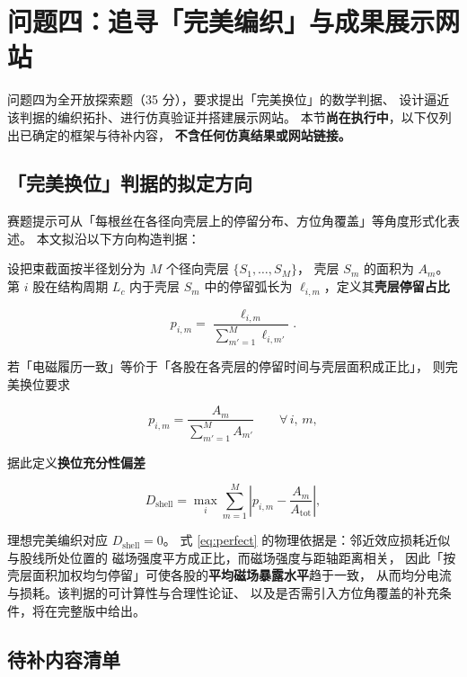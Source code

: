 \documentclass[12pt, a4paper]{ctexart}
\begin{document}
\section{问题四：追寻「完美编织」与成果展示网站}
\label{sec:q4}

\begin{todobox}[本节状态说明]
问题四为全开放探索题（35 分），要求提出「完美换位」的数学判据、
设计逼近该判据的编织拓扑、进行仿真验证并搭建展示网站。
本节\textbf{尚在执行中}，以下仅列出已确定的框架与待补内容，
\textbf{不含任何仿真结果或网站链接。}
\end{todobox}

\subsection{「完美换位」判据的拟定方向}

赛题提示可从「每根丝在各径向壳层上的停留分布、方位角覆盖」等角度形式化表述。
本文拟沿以下方向构造判据：

设把束截面按半径划分为 $M$ 个径向壳层 $\{S_1,\dots,S_M\}$，
壳层 $S_m$ 的面积为 $A_m$。第 $i$ 股在结构周期 $L_c$ 内于壳层 $S_m$ 中的停留弧长为
$\ell_{i,m}$，定义其\textbf{壳层停留占比}

\begin{equation}
p_{i,m} = \frac{\ell_{i,m}}{\sum_{m'=1}^{M}\ell_{i,m'}} .
\label{eq:shell-occupancy}
\end{equation}

若「电磁履历一致」等价于「各股在各壳层的停留时间与壳层面积成正比」，
则完美换位要求

\begin{equation}
p_{i,m} = \frac{A_m}{\sum_{m'=1}^{M} A_{m'}}
\qquad \forall\, i,\, m ,
\label{eq:perfect}
\end{equation}

据此定义\textbf{换位充分性偏差}

\begin{equation}
D_{\mathrm{shell}} = \max_{i} \sum_{m=1}^{M}
\left| p_{i,m} - \frac{A_m}{A_{\mathrm{tot}}} \right| ,
\label{eq:Dshell}
\end{equation}

理想完美编织对应 $D_{\mathrm{shell}} = 0$。
式 \eqref{eq:perfect} 的物理依据是：邻近效应损耗近似与股线所处位置的
磁场强度平方成正比，而磁场强度与距轴距离相关，
因此「按壳层面积加权均匀停留」可使各股的\textbf{平均磁场暴露水平}趋于一致，
从而均分电流与损耗。该判据的可计算性与合理性论证、
以及是否需引入方位角覆盖的补充条件，将在完整版中给出。

\subsection{待补内容清单}
\end{document}
